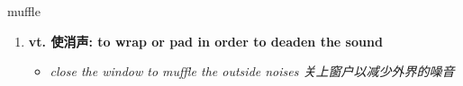 
\begin{frame}
{\huge muffle}
\begin{center}
\begin{enumerate}\Large
  \item \textbf{vt. 使消声: to wrap or pad in order to deaden the sound}
  \begin{itemize}
    \item \em{\Large{close the window to muffle the outside noises 关上窗户以减少外界的噪音}}
  \end{itemize}
\end{enumerate}
\end{center}
\end{frame}
